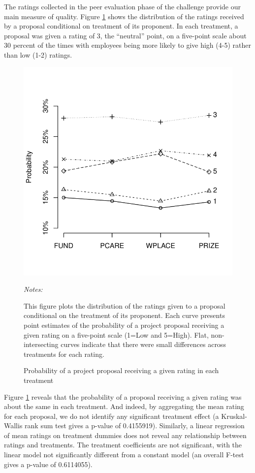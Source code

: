 \documentclass[11pt, titlepage]{article}
\newenvironment{tablenotes}[1][]{
  \begin{minipage}{\textwidth}\emph{Notes:}{\footnotesize #1}
}{\end{minipage}}
\begin{document}
The ratings collected in the peer evaluation phase of the challenge
provide our main measure of quality. Figure \ref{fig: ratings} shows the
distribution of the ratings received by a proposal conditional on
treatment of its proponent. In each treatment, a proposal was given a
rating of 3, the ``neutral'' point, on a five-point scale about 30
percent of the times with employees being more likely to give high (4-5)
rather than low (1-2) ratings.

\begin{figure}
  \centering
  \caption{Probability of a project proposal receiving a given rating in each treatment}
  \label{fig: ratings}
  \includegraphics{figures/plot-ratings-1.pdf}
  \begin{tablenotes}
  This figure plots the distribution of the ratings given to a proposal conditional on the treatment of its proponent. Each curve presents point estimates of the probability of a project proposal receiving a given rating on a five-point scale (1=Low and 5=High). Flat, non-intersecting curves indicate that there were small differences across treatments for each rating.
  \end{tablenotes}
\end{figure}

Figure \ref{fig: ratings} reveals that the probability of a proposal
receiving a given rating was about the same in each treatment. And
indeed, by aggregating the mean rating for each proposal, we do not
identify any significant treatment effect (a Kruskal-Wallis rank sum
test gives a p-value of 0.4155919). Similarly, a linear regression of
mean ratings on treatment dummies does not reveal any relationship
between ratings and treatments. The treatment coefficients are not
significant, with the linear model not significantly different from a
constant model (an overall F-test gives a p-value of 0.6114055).
\end{document}

